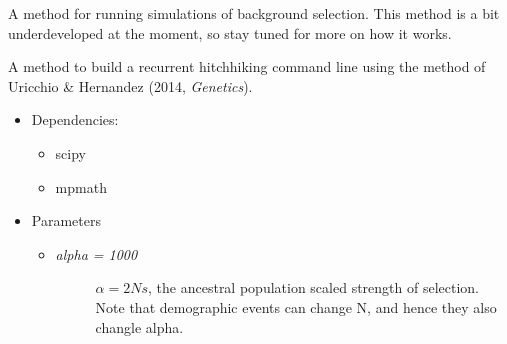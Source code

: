 \documentclass[letterpaper,10pt,english]{sphinxmanual}
\begin{document}
\begin{fulllineitems}
\begin{fulllineitems}
\end{fulllineitems}


\begin{fulllineitems}
\label{index:command.SFSCommand.build_BGS}
A method for running simulations of background selection.  This method
is a bit underdeveloped at the moment, so stay tuned for more on how
it works.

\end{fulllineitems}


\begin{fulllineitems}
\label{index:command.SFSCommand.build_RHH}
A method to build a recurrent hitchhiking command line using the 
method of Uricchio \& Hernandez (2014, \emph{Genetics}).
\begin{itemize}
\item {} 
Dependencies:
\begin{itemize}
\item {} 
scipy

\item {} 
mpmath

\end{itemize}

\item {} 
Parameters
\begin{itemize}
\item {} \begin{description}
\item[{\emph{alpha = 1000} }] \leavevmode
\(\alpha = 2Ns\), the ancestral population 
scaled strength of selection.  Note that demographic events 
can change N, and hence they also changle alpha.


\end{description}
\end{itemize}
\end{itemize}
\end{fulllineitems}
\end{fulllineitems}
\end{document}
